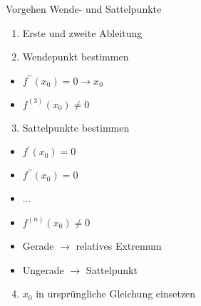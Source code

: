 \begin{KR}{Vorgehen Wende- und Sattelpunkte}
    \begin{enumerate}
  \item Erste und zweite Ableitung

  \item Wendepunkt bestimmen

\end{enumerate}

\begin{itemize}
  \item $f^{\prime \prime}\left(x_{0}\right)=0 \rightarrow x_{0}$
  \item $f^{(3)}\left(x_{0}\right) \neq 0$
\end{itemize}

\begin{enumerate}
  \setcounter{enumi}{2}
  \item Sattelpunkte bestimmen
\end{enumerate}

\begin{itemize}
  \item $f^{\prime}\left(x_{0}\right)=0$
  \item $f^{\prime \prime}\left(x_{0}\right)=0$
  \item ...
  \item $f^{(n)}\left(x_{0}\right) \neq 0$
  \item Gerade $\rightarrow$ relatives Extremum
  \item Ungerade $\rightarrow$ Sattelpunkt
\end{itemize}

\begin{enumerate}
  \setcounter{enumi}{3}
  \item $x_{0}$ in ursprüngliche Gleichung einsetzen
\end{enumerate}
\end{KR}











